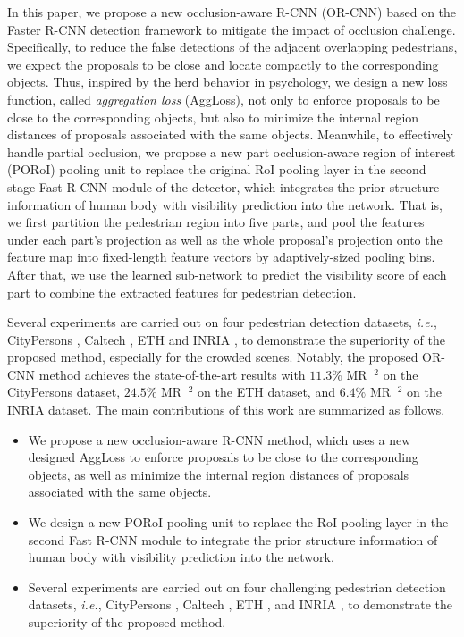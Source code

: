 \documentclass[runningheads]{llncs}
\def\ie{{\em i.e.}}
\begin{document}
In this paper, we propose a new occlusion-aware R-CNN (OR-CNN) based on the Faster R-CNN detection framework \cite{DBLP:journals/pami/RenHG017} to mitigate the impact of occlusion challenge. Specifically, to reduce the false detections of the adjacent overlapping pedestrians, we expect the proposals to be close and locate compactly to the corresponding objects. Thus, inspired by the herd behavior in psychology, we design a new loss function, called {\em aggregation loss} (AggLoss), not only to enforce proposals to be close to the corresponding objects, but also to minimize the internal region distances of proposals associated with the same objects. Meanwhile, to effectively handle partial occlusion, we propose a new part occlusion-aware region of interest (PORoI) pooling unit to replace the original RoI pooling layer in the second stage Fast R-CNN module of the detector, which integrates the prior structure information of human body with visibility prediction into the network. That is, we first partition the pedestrian region into five parts, and pool the features under each part's projection as well as the whole proposal's projection onto the feature map into fixed-length feature vectors by adaptively-sized pooling bins. After that, we use the learned sub-network to predict the visibility score of each part to combine the extracted features for pedestrian detection.


Several experiments are carried out on four pedestrian detection datasets, \ie, CityPersons \cite{DBLP:conf/cvpr/ZhangBS17}, Caltech \cite{DBLP:journals/pami/DollarWSP12}, ETH \cite{DBLP:conf/iccv/EssLG07} and INRIA \cite{DBLP:conf/cvpr/DalalT05}, to demonstrate the superiority of the proposed method, especially for the crowded scenes. Notably, the proposed OR-CNN method achieves the state-of-the-art results with $11.3\%$ MR$^{-2}$ on the CityPersons dataset, $24.5\%$ MR$^{-2}$ on the ETH dataset, and $6.4\%$ MR$^{-2}$ on the INRIA dataset. The main contributions of this work are summarized as follows.
\begin{itemize}
\item We propose a new occlusion-aware R-CNN method, which uses a new designed AggLoss to enforce proposals to be close to the corresponding objects, as well as minimize the internal region distances of proposals associated with the same objects.
\item We design a new PORoI pooling unit to replace the RoI pooling layer in the second Fast R-CNN module to integrate the prior structure information of human body with visibility prediction into the network.
\item Several experiments are carried out on four challenging pedestrian detection datasets, \ie, CityPersons \cite{DBLP:conf/cvpr/ZhangBS17}, Caltech \cite{DBLP:journals/pami/DollarWSP12}, ETH \cite{DBLP:conf/iccv/EssLG07}, and INRIA \cite{DBLP:conf/cvpr/DalalT05}, to demonstrate the superiority of the proposed method.
\end{itemize}
\end{document}
